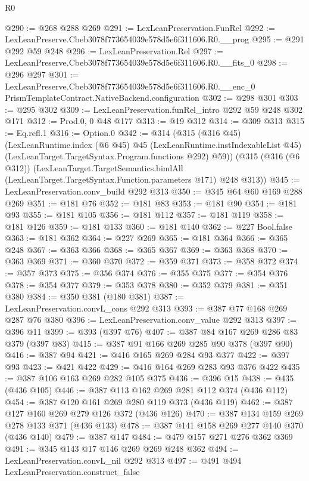 \begin{lexlean}{R0}
\begin{coremodule}
@290 := @268 @288 @269
@291 := LexLeanPreservation.FunRel
@292 := LexLeanPreserve.Cbeb3078f773654039e578d5e6f311606.R0.__prog
@295 := @291 @292 @59 @248
@296 := LexLeanPreservation.Rel
@297 := LexLeanPreserve.Cbeb3078f773654039e578d5e6f311606.R0.__fits_0
@298 := @296 @297
@301 := LexLeanPreserve.Cbeb3078f773654039e578d5e6f311606.R0.__enc_0
    PrismTemplateContract.NativeBackend.configuration
@302 := @298 @301
@303 := @295 @302
@309 := LexLeanPreservation.funRel_intro @292 @59 @248 @302 @171
@312 := Prod.{0, 0} @48 @177
@313 := @19 @312
@314 := @309 @313
@315 := Eq.refl.{1}
@316 := Option.{0}
@342 := @314
    (@315
      (@316 @45)
      (LexLeanRuntime.index
        (@6 @45)
        @45
        (LexLeanRuntime.instIndexableList @45)
        (LexLeanTarget.TargetSyntax.Program.functions @292)
        @59))
    (@315
      (@316 (@6 @312))
      (LexLeanTarget.TargetSemantics.bindAll
        (LexLeanTarget.TargetSyntax.Function.parameters @171)
        @248
        @313))
@345 := LexLeanPreservation.conv_build @292 @313
@350 := @345 @64 @60 @169 @288 @269
@351 := @181 @76
@352 := @181 @83
@353 := @181 @90
@354 := @181 @93
@355 := @181 @105
@356 := @181 @112
@357 := @181 @119
@358 := @181 @126
@359 := @181 @133
@360 := @181 @140
@362 := @227 Bool.false
@363 := @181 @362
@364 := @227 @269
@365 := @181 @364
@366 := @365 @248
@367 := @363 @366
@368 := @365 @367
@369 := @363 @368
@370 := @363 @369
@371 := @360 @370
@372 := @359 @371
@373 := @358 @372
@374 := @357 @373
@375 := @356 @374
@376 := @355 @375
@377 := @354 @376
@378 := @354 @377
@379 := @353 @378
@380 := @352 @379
@381 := @351 @380
@384 := @350 @381 (@180 @381)
@387 := LexLeanPreservation.convL_cons @292 @313
@393 := @387 @77 @168 @269 @287 @76 @380
@396 := LexLeanPreservation.conv_value @292 @313
@397 := @396 @11
@399 := @393 (@397 @76)
@407 := @387 @84 @167 @269 @286 @83 @379 (@397 @83)
@415 := @387 @91 @166 @269 @285 @90 @378 (@397 @90)
@416 := @387 @94
@421 := @416 @165 @269 @284 @93 @377
@422 := @397 @93
@423 := @421 @422
@429 := @416 @164 @269 @283 @93 @376 @422
@435 := @387 @106 @163 @269 @282 @105 @375
@436 := @396 @15
@438 := @435 (@436 @105)
@446 := @387 @113 @162 @269 @281 @112 @374 (@436 @112)
@454 := @387 @120 @161 @269 @280 @119 @373 (@436 @119)
@462 := @387 @127 @160 @269 @279 @126 @372 (@436 @126)
@470 := @387 @134 @159 @269 @278 @133 @371 (@436 @133)
@478 := @387 @141 @158 @269 @277 @140 @370 (@436 @140)
@479 := @387 @147
@484 := @479 @157 @271 @276 @362 @369
@491 := @345 @143 @17 @146 @269 @269 @248 @362
@494 := LexLeanPreservation.convL_nil @292 @313
@497 := @491 @494 LexLeanPreservation.construct_false

\end{coremodule}
\end{lexlean}
